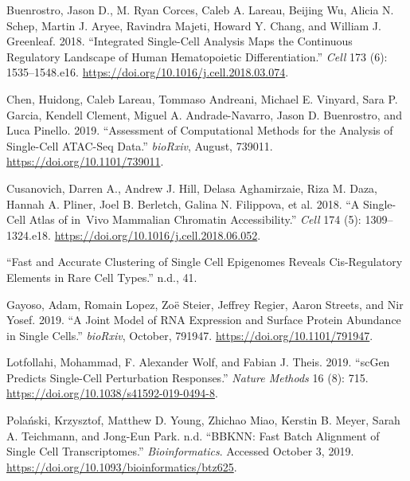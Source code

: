 \documentclass[]{article}
\begin{document}
\hypertarget{refs}{}
\leavevmode\hypertarget{ref-buenrostroIntegratedSingleCellAnalysis2018}{}%
Buenrostro, Jason D., M. Ryan Corces, Caleb A. Lareau, Beijing Wu,
Alicia N. Schep, Martin J. Aryee, Ravindra Majeti, Howard Y. Chang, and
William J. Greenleaf. 2018. ``Integrated Single-Cell Analysis Maps the
Continuous Regulatory Landscape of Human Hematopoietic
Differentiation.'' \emph{Cell} 173 (6): 1535--1548.e16.
\url{https://doi.org/10.1016/j.cell.2018.03.074}.

\leavevmode\hypertarget{ref-chenAssessmentComputationalMethods2019a}{}%
Chen, Huidong, Caleb Lareau, Tommaso Andreani, Michael E. Vinyard, Sara
P. Garcia, Kendell Clement, Miguel A. Andrade-Navarro, Jason D.
Buenrostro, and Luca Pinello. 2019. ``Assessment of Computational
Methods for the Analysis of Single-Cell ATAC-Seq Data.'' \emph{bioRxiv},
August, 739011. \url{https://doi.org/10.1101/739011}.

\leavevmode\hypertarget{ref-cusanovichSingleCellAtlasVivo2018a}{}%
Cusanovich, Darren A., Andrew J. Hill, Delasa Aghamirzaie, Riza M. Daza,
Hannah A. Pliner, Joel B. Berletch, Galina N. Filippova, et al. 2018.
``A Single-Cell Atlas of in~Vivo Mammalian Chromatin Accessibility.''
\emph{Cell} 174 (5): 1309--1324.e18.
\url{https://doi.org/10.1016/j.cell.2018.06.052}.

\leavevmode\hypertarget{ref-FastAccurateClusteringa}{}%
``Fast and Accurate Clustering of Single Cell Epigenomes Reveals
Cis-Regulatory Elements in Rare Cell Types.'' n.d., 41.

\leavevmode\hypertarget{ref-gayosoJointModelRNA2019}{}%
Gayoso, Adam, Romain Lopez, Zoë Steier, Jeffrey Regier, Aaron Streets,
and Nir Yosef. 2019. ``A Joint Model of RNA Expression and Surface
Protein Abundance in Single Cells.'' \emph{bioRxiv}, October, 791947.
\url{https://doi.org/10.1101/791947}.

\leavevmode\hypertarget{ref-lotfollahiScGenPredictsSinglecell2019}{}%
Lotfollahi, Mohammad, F. Alexander Wolf, and Fabian J. Theis. 2019.
``scGen Predicts Single-Cell Perturbation Responses.'' \emph{Nature
Methods} 16 (8): 715. \url{https://doi.org/10.1038/s41592-019-0494-8}.

\leavevmode\hypertarget{ref-polanskiBBKNNFastBatch}{}%
Polański, Krzysztof, Matthew D. Young, Zhichao Miao, Kerstin B. Meyer,
Sarah A. Teichmann, and Jong-Eun Park. n.d. ``BBKNN: Fast Batch
Alignment of Single Cell Transcriptomes.'' \emph{Bioinformatics}.
Accessed October 3, 2019.
\url{https://doi.org/10.1093/bioinformatics/btz625}.
\end{document}
